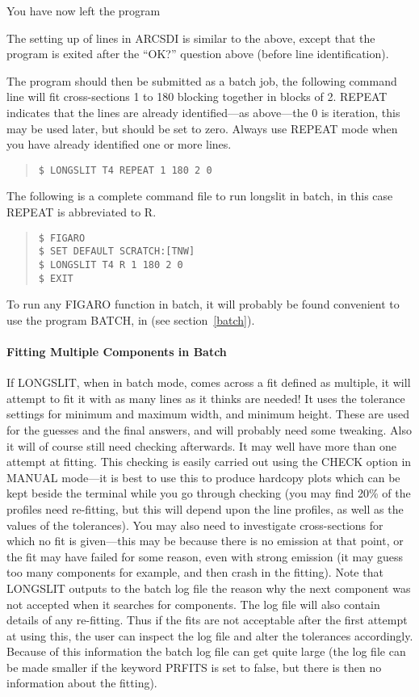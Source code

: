 You have now left the program

The setting up of lines in ARCSDI is similar to the above, except that
the program is exited after the ``OK?'' question above (before line
identification).

The program should then be submitted as a batch job, the following
command line will fit cross-sections 1 to 180 blocking together in
blocks of 2.
REPEAT indicates that the lines are already identified---as above---the
0 is iteration, this may be used later, but should be set to zero.
Always use REPEAT mode when you have already identified one or more
lines.
\begin{quote}\begin{verbatim}
$ LONGSLIT T4 REPEAT 1 180 2 0
\end{verbatim}\end{quote}
The following is a complete command file to run longslit in batch,
in this case REPEAT is abbreviated to R.
\begin{quote}\begin{verbatim}
$ FIGARO
$ SET DEFAULT SCRATCH:[TNW]
$ LONGSLIT T4 R 1 180 2 0
$ EXIT
\end{verbatim}\end{quote}
To run any FIGARO function in batch, it will probably be found
convenient to use the program BATCH, in (see section~\ref{batch}).

\paragraph{Fitting Multiple Components in Batch}
\label{long.mb}

If LONGSLIT, when in batch mode, comes across a fit defined as multiple,
it will attempt to fit it with as many lines as it thinks are needed!
It uses the tolerance settings for minimum and maximum width, and
minimum height.
These are used for the guesses and the final answers, and will probably
need some tweaking.
Also it will of course still need checking afterwards.
It may well have more than one attempt at fitting. This checking is
easily carried out using the CHECK option in MANUAL mode---it
is best to use this to produce hardcopy plots which can be kept beside
the terminal while you go through checking (you may find 20\% of the
profiles need re-fitting, but this will depend upon the line profiles,
as well as the values of the tolerances). You may also need to
investigate cross-sections for which no fit is given---this may be
because there is no emission at that point, or the fit may have failed
for some reason, even with strong emission (it may guess too many
components for example, and then crash in the fitting).
Note that LONGSLIT outputs to the batch log file the reason why the next
component was not accepted when it searches for components. The log file
will also contain details of any re-fitting.
Thus if the fits are not acceptable after the first attempt at using
this, the user can inspect the log file and alter the tolerances
accordingly.
Because of this information the batch log file can get quite large (the
log file can be made smaller if the keyword PRFITS is set to false, but
there is then no information about the fitting).

